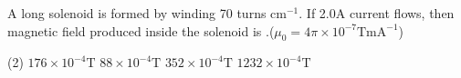 \item A long solenoid is formed by winding 70 turns cm\(^{-1}\). If 2.0A current flows, then magnetic field produced inside the solenoid is \underline{\hspace{2.5cm}}.(\(\mu_0 = 4\pi \times 10^{-7} \mathrm{TmA}^{-1}\))
    \begin{tasks}(2)
        \task \(176 \times 10^{-4} \mathrm{T}\)
        \task \(88 \times 10^{-4} \mathrm{T}\)
        \task \(352 \times 10^{-4} \mathrm{T}\)
        \task \(1232 \times 10^{-4} \mathrm{T}\)
    \end{tasks}